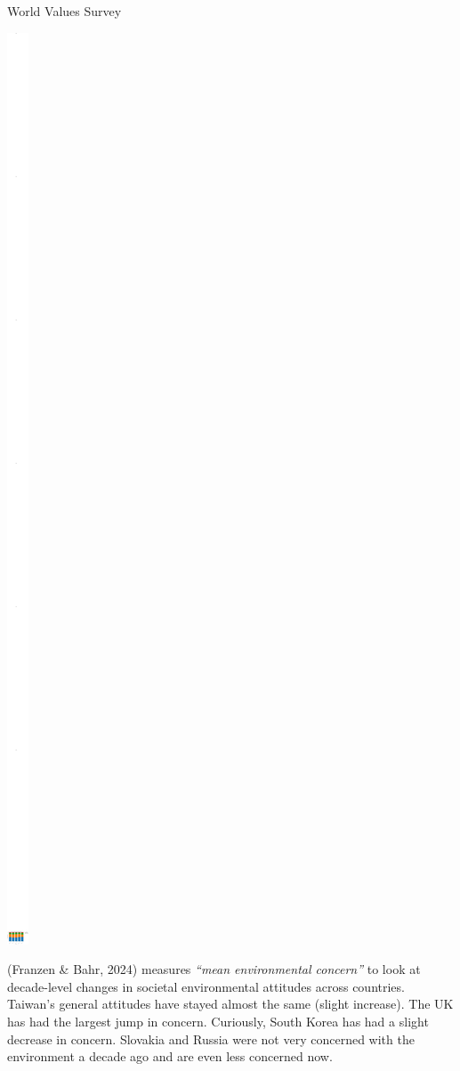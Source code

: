 \documentclass[
  letterpaper,
  DIV=11,
  numbers=noendperiod]{scrartcl}
\begin{document}
World Values Survey

\includegraphics{_thesis_files/figure-pdf/cell-5-output-1.pdf}

(Franzen \& Bahr, 2024) measures \emph{``mean environmental concern''}
to look at decade-level changes in societal environmental attitudes
across countries. Taiwan's general attitudes have stayed almost the same
(slight increase). The UK has had the largest jump in concern.
Curiously, South Korea has had a slight decrease in concern. Slovakia
and Russia were not very concerned with the environment a decade ago and
are even less concerned now.
\end{document}
